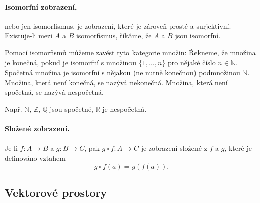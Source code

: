 \documentclass{article}
\newcommand{\0}{\vec{0}}
\newcommand{\N}{\mathbb N}
\newcommand{\Q}{\mathbb Q}
\newcommand{\R}{\mathbb R}
\newcommand{\Z}{\mathbb Z}
\begin{document}
\paragraph{Isomorfní zobrazení,} nebo jen isomorfismus, je zobrazení, které je zároveň prosté a surjektivní.
Existuje-li mezi $A$ a $B$ isomorfismus, říkáme, že $A$ a $B$ jsou isomorfní.

Pomocí isomorfismů můžeme zavést tyto kategorie množin:
Řekneme, že množina je konečná, pokud je isomorfní s množinou $\{1,\ldots,n\}$ pro nějaké číslo $n\in\N$.
Spočetná množina je isomorfní s nějakou (ne nutně konečnou) podmnožinou $\N$.
Množina, která není konečná, se nazývá nekonečná.
Množina, která není spočetná, se nazývá nespočetná.

Např. $\N$, $\Z$, $\Q$ jsou spočetné, $\R$ je nespočetná.

\paragraph{Složené zobrazení.} Je-li $f:A\to B$ a $g:B\to C$, pak $g\circ f:A\to C$ je zobrazení složené z $f$ a $g$, které je definováno vztahem
$$ g\circ f(a) = g(f(a)). $$


\subsection{Vektorové prostory}
\end{document}
